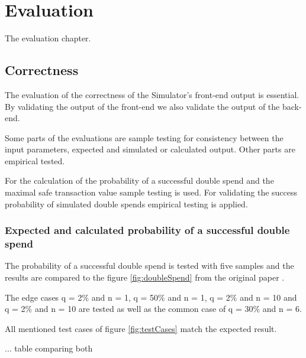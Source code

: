 \chapter{Evaluation}
\label{chapter:evaluation}

The evaluation chapter.

\section{Correctness}

The evaluation of the correctness of the Simulator's front-end output is essential. By validating the output of the front-end we also validate the output of the back-end.\linebreak

Some parts of the evaluations are sample testing for consistency between the input parameters, expected and simulated or calculated output. Other parts are empirical tested.\linebreak

For the calculation of the probability of a successful double spend and the maximal safe transaction value sample testing is used. For validating the success probability of simulated double spends empirical testing is applied.

\subsection{Expected and calculated probability of a successful double spend}
\label{subsection:evalCalcDoubleSpending}

The probability of a successful double spend is tested with five samples and the results are compared to the figure \ref{fig:doubleSpend} from the original paper \cite{doublespending}.\linebreak

The edge cases q = 2\% and n = 1, q = 50\% and n = 1, q = 2\% and n = 10 and q = 2\% and n = 10 are tested as well as the common case of q = 30\% and n = 6.\linebreak

All mentioned test cases of figure \ref{fig:testCases} match the expected result.

... table comparing both

